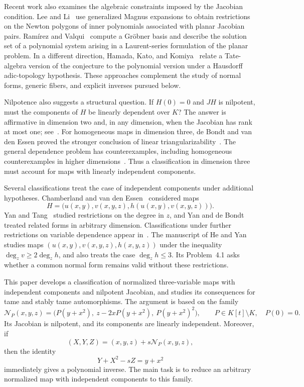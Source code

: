 \documentclass[11pt,reqno]{amsart}
\theoremstyle{definition}
\theoremstyle{remark}
\numberwithin{equation}{section}
\newcommand{\Ncal}{\mathcal N}
\begin{document}
Recent work also examines the algebraic constraints imposed by the Jacobian condition. Lee and Li~\cite{LeeLi2024} use generalized Magnus expansions to obtain restrictions on the Newton polygons of inner polynomials associated with planar Jacobian pairs. Ram\'irez and Valqui~\cite{RamirezValqui2025} compute a Gr\"obner basis and describe the solution set of a polynomial system arising in a Laurent-series formulation of the planar problem. In a different direction, Hamada, Kato, and Komiya~\cite{HamadaKatoKomiya2025} relate a Tate-algebra version of the conjecture to the polynomial version under a Hausdorff adic-topology hypothesis. These approaches complement the study of normal forms, generic fibers, and explicit inverses pursued below.

Nilpotence also suggests a structural question. If $H(0)=0$ and $JH$ is nilpotent, must the components of $H$ be linearly dependent over $K$? The answer is affirmative in dimension two and, in any dimension, when the Jacobian has rank at most one; see~\cite{BCW,deBondtYan2014}. For homogeneous maps in dimension three, de Bondt and van den Essen proved the stronger conclusion of linear triangularizability~\cite{deBondtEssen}. The general dependence problem has counterexamples, including homogeneous counterexamples in higher dimensions~\cite{deBondt2006}. Thus a classification in dimension three must account for maps with linearly independent components.

Several classifications treat the case of independent components under additional hypotheses. Chamberland and van den Essen~\cite{ChamberlandEssen} considered maps
\[
 H=\bigl(u(x,y),v(x,y,z),h(u(x,y),v(x,y,z))\bigr).
\]
Yan and Tang~\cite{YanTang} studied restrictions on the degree in $z$, and Yan and de Bondt~\cite{YanBondt2019} treated related forms in arbitrary dimension. Classifications under further restrictions on variable dependence appear in~\cite{CastanedaEssen,Yan2022}. The manuscript of He and Yan~\cite{HeYan} studies maps $(u(x,y),v(x,y,z),h(x,y,z))$ under the inequality $\deg_zv\geq2\deg_zh$, and also treats the case $\deg_zh\leq3$. Its Problem~4.1 asks whether a common normal form remains valid without these restrictions.

This paper develops a classification of normalized three-variable maps with independent components and nilpotent Jacobian, and studies its consequences for tame and stably tame automorphisms. The argument is based on the family
\begin{equation}\label{eq:canonical-intro}
 \Ncal_P(x,y,z)=\bigl(P(y+x^2),\ z-2xP(y+x^2),\ P(y+x^2)^2\bigr),
 \qquad P\in K[t]\setminus K,\quad P(0)=0.
\end{equation}
Its Jacobian is nilpotent, and its components are linearly independent. Moreover, if
\[
 (X,Y,Z)=(x,y,z)+s\Ncal_P(x,y,z),
\]
then the identity
\begin{equation}\label{eq:intro-invariant}
 Y+X^2-sZ=y+x^2
\end{equation}
immediately gives a polynomial inverse. The main task is to reduce an arbitrary normalized map with independent components to this family.
\end{document}
